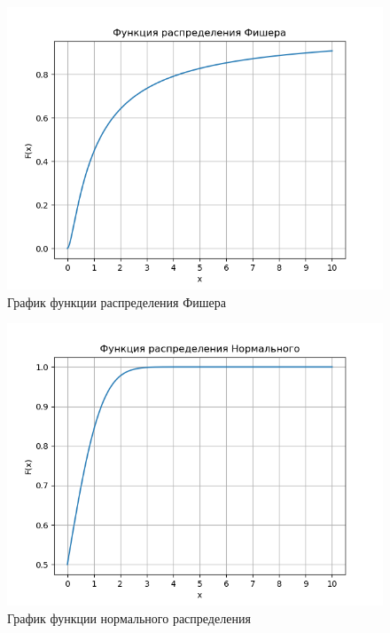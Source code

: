 \documentclass[a4]{article}
\begin{document}
\begin{center}
\begin{figure}[H]
\caption{График функции распределения Фишера}
\includegraphics[width=\textwidth]{output/task1/fisher_chart.png}
\end{figure}

\begin{figure}[H]
\caption{График функции нормального распределения}
\includegraphics[width=\textwidth]{output/task1/norm_chart.png}
\end{figure}

\end{center}
\end{document}
